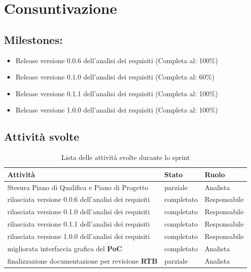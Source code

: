 \section{Consuntivazione}

\subsection{Milestones:}
\begin{itemize}
    \item Release versione 0.0.6 dell'analisi dei requisiti (Completa al: 100\%)
    \item Release versione 0.1.0 dell'analisi dei requisiti (Completa al: 60\%)
    \item Release versione 0.1.1 dell'analisi dei requisiti (Completa al: 100\%)
    \item Release versione 1.0.0 dell'analisi dei requisiti (Completa al: 100\%)
\end{itemize}

\subsection{Attività svolte}

\begin{table}[H]
    \begin{xltabular}{\textwidth}{X l l}

         \textbf{Attività} & \textbf{Stato} & \textbf{Ruolo}\\
        \endhead
        \hline
        Stesura Piano di Qualifica e Piano di Progetto & parziale & Analista \\
        rilasciata versione 0.0.6 dell'analisi dei requisiti & completato & Responsabile \\
        rilasciata versione 0.1.0 dell'analisi dei requisiti & completato & Responsabile \\
        rilasciata versione 0.1.1 dell'analisi dei requisiti & completato & Responsabile \\
        rilasciata versione 1.0.0 dell'analisi dei requisiti & completato & Responsabile \\
        migliorata interfaccia grafica del \textbf{PoC} & completato & Analista \\
        finalizzazione documentazione per revisione \textbf{RTB} & parziale & Analista \\
    \end{xltabular}
    \caption{Lista delle attività svolte durante lo sprint}
\end{table}


